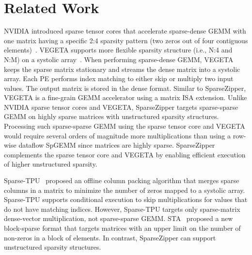 \section{Related Work}
\label{sec-spz-related-work}

NVIDIA introduced sparse tensor cores that accelerate sparse-dense GEMM with
one matrix having a specific 2:4 sparsity pattern (two zeros out of four
contiguous
elements)~\cite{pool-nvidia-sparse-tensor-2021,choquette-nvidia-tensor-core-2021}.
VEGETA supports more flexible sparsity structure (i.e., N:4 and N:M) on a
systolic array~\cite{jeong-vegeta-hpca2023}.
When performing sparse-dense GEMM, VEGETA keeps the sparse matrix stationary
and streams the dense matrix into a systolic array.
Each PE performs index matching to either skip or multiply two input values.
The output matrix is stored in the dense format.
Similar to SparseZipper, VEGETA is a fine-grain GEMM accelerator using a matrix
ISA extension.
Unlike NVIDIA sparse tensor cores and VEGETA, SparseZipper targets sparse-sparse
GEMM on highly sparse matrices with unstructured sparsity structures.
Processing such sparse-sparse GEMM using the sparse tensor core and VEGETA
would require several orders of magnitude more multiplications than using a
row-wise dataflow SpGEMM since matrices are highly sparse.
SparseZipper complements the sparse tensor core and VEGETA by enabling efficient execution of higher unstructured sparsity.


Sparse-TPU~\cite{he-sparse-tpu-ics2020} proposed an offline column packing
algorithm that merges sparse columns in a matrix to minimize the number of
zeros mapped to a systolic array.
Sparse-TPU supports conditional execution to skip multiplications for values
that do not have matching indices.
However, Sparse-TPU targets only sparse-matrix dense-vector multiplication, not
sparse-sparse GEMM.
STA~\cite{liu-sta-cal2020} proposed a new block-sparse format that targets
matrices with an upper limit on the number of non-zeros in a block of elements.
In contrast, SparseZipper can support unstructured sparsity structures.

